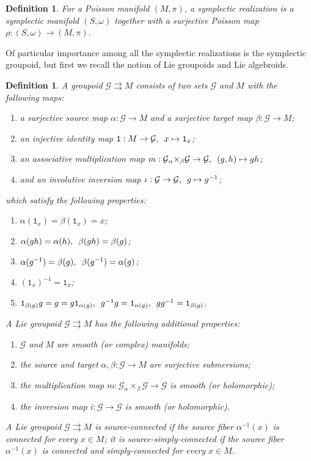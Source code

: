 \documentclass{amsart}
\newtheorem{definition}[theorem]{Definition}
\numberwithin{equation}{section}
\newcommand{\cG}{\mathcal{G}}
\begin{document}
\begin{definition}
  For a Poisson manifold $(M, \pi)$, a symplectic realization is a symplectic manifold $(S, \omega)$ together with a surjective Poisson map $\rho: (S, \omega) \to (M, \pi)$.
\end{definition}

Of particular importance among all the symplectic realizations is the symplectic groupoid, but first we recall the notion of Lie groupoids and Lie algebroids.
\begin{definition} \label{def:groupoid}
  A \emph{groupoid} $\cG\rightrightarrows M$ consists of two sets $\cG$ and $M$ with the following maps:
  \begin{enumerate}
    \item a surjective \emph{source map} $\alpha: \cG \to M$ and a surjective \emph{target map} $\beta: \cG \to M$;
    \item an injective identity map $\mathtt{1}: M \to \cG, \enskip x \mapsto \mathtt{1}_x$;
    \item an associative multiplication map $m: \cG {_\alpha \times_\beta} \cG \to \cG, \enskip (g, h) \mapsto gh$;
    \item and an involutive inversion map $\iota: \cG \to \cG, \enskip g \mapsto g^{-1}$;
  \end{enumerate}
  which satisfy the following properties:
  \begin{enumerate}
    \item $\alpha(\mathtt{1}_x) = \beta(\mathtt{1}_x) = x$;
    \item $\alpha(gh) = \alpha(h), \enskip \beta(gh) = \beta(g)$;
    \item $\alpha(g^{-1}) = \beta(g), \enskip \beta(g^{-1}) = \alpha(g)$;
    \item $(\mathtt{1}_x)^{-1} = \mathtt{1}_x$;
    \item $\mathtt{1}_{\beta(g)}g=g=g\mathtt{1}_{\alpha(g)}, \enskip g^{-1}g=\mathtt{1}_{\alpha(g)}, \enskip gg^{-1}=\mathtt{1}_{\beta(g)}$.
  \end{enumerate}
  A \emph{Lie groupoid} $\cG \rightrightarrows M$ has the following additional properties:
  \begin{enumerate}
    \item $\cG$ and $M$ are smooth (or complex) manifolds;
    \item the source and target $\alpha,\beta: \cG \to M$ are surjective submersions;
    \item the multiplication map $m: \cG {_\alpha \times_\beta} \cG \to \cG$ is smooth (or holomorphic);
    \item the inversion map $i: \cG \to \cG$ is smooth (or holomorphic).
  \end{enumerate}
  A Lie groupoid $\cG \rightrightarrows M$ is \emph{source-connected} if the source fiber $\alpha^{-1}(x)$ is connected for every $x \in M$; it is \emph{source-simply-connected} if the source fiber $\alpha^{-1}(x)$ is connected and simply-connected for every $x \in M$.
\end{definition}
\end{document}
